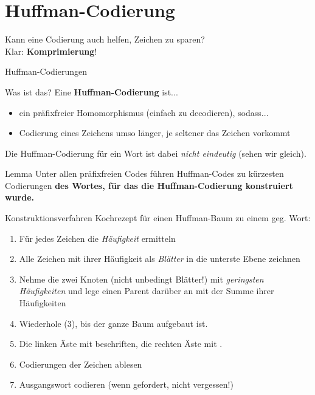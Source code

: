 \section{Huffman-Codierung}

\begin{frame}
	Kann eine Codierung auch helfen, Zeichen zu sparen? \\
	\pause
	\impl Klar: \textbf{Komprimierung}!
\end{frame}

\begin{frame}{Huffman-Codierungen}
	\begin{block}{Was ist das?}
		Eine \textbf{Huffman-Codierung} ist...
		\begin{itemize}
			\item ein präfixfreier Homomorphismus {\small (\impl einfach zu decodieren)}, sodass...
			\item Codierung eines Zeichens umso länger, je seltener das Zeichen vorkommt
		\end{itemize}
	\end{block}
	
	Die Huffman-Codierung für ein Wort ist dabei \textit{nicht eindeutig} (sehen wir gleich).
	\pause
	\begin{block}{Lemma}
		Unter allen präfixfreien Codes führen Huffman-Codes zu kürzesten Codierungen
		\textbf{des Wortes, für das die Huffman-Codierung konstruiert wurde.}
	\end{block}
\end{frame}

\begin{frame}{Konstruktionsverfahren}
	Kochrezept für einen Huffman-Baum zu einem geg. Wort:
	\begin{enumerate}
		\item Für jedes Zeichen die \emph{Häufigkeit} ermitteln
		\item Alle Zeichen mit ihrer Häufigkeit als \emph{Blätter} in die unterste Ebene zeichnen
		\item Nehme die zwei Knoten {\small (nicht unbedingt Blätter!)} mit \emph{geringsten Häufigkeiten} und lege einen Parent darüber an mit der Summe ihrer Häufigkeiten
		\item Wiederhole (3), bis der ganze Baum aufgebaut ist.
		\item Die linken Äste mit  beschriften, die rechten Äste mit .
		\item Codierungen der Zeichen ablesen
		\item Ausgangswort codieren (wenn gefordert, nicht vergessen!)
	\end{enumerate}
\end{frame}

